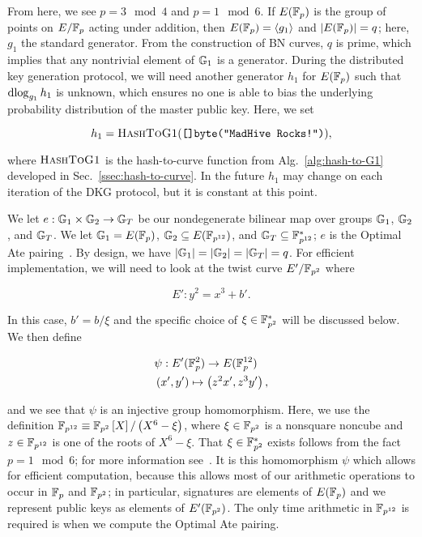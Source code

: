 \noindent
From here, we see $p = 3 \mod 4$ and $p = 1 \mod 6$.
If $E(\mathbb{F}_{p})$ is the group of points on $E/\mathbb{F}_{p}$
acting under addition, then $E(\mathbb{F}_{p}) = \left\langle g_{1} \right\rangle$
and $\left| E(\mathbb{F}_{p}) \right| = q$; here, $g_{1}$ the standard generator.
From the construction of BN curves, $q$ is prime,
which implies that any nontrivial element of $\mathbb{G}_{1}$ is a generator.
During the distributed key generation protocol, we will
need another generator $h_{1}$ for $E(\mathbb{F}_{p})$ such that
$\operatorname{dlog}_{g_{1}}h_{1}$ is unknown, which ensures no one
is able to bias the underlying probability distribution
of the master public key.
Here, we set

\begin{equation}
    h_{1} = \textsc{HashToG1}(\texttt{[]byte("MadHive Rocks!")}),
\end{equation}

\noindent
where $\textsc{HashToG1}$ is the hash-to-curve function
from Alg.~\ref{alg:hash-to-G1} developed in
Sec.~\ref{ssec:hash-to-curve}.
In the future $h_{1}$ may change on each iteration of the DKG
protocol, but it is constant at this point.


We let $e:\mathbb{G}_{1}\times\mathbb{G}_{2}\to\mathbb{G}_{T}$ be our nondegenerate
bilinear map over groups $\mathbb{G}_{1}$, $\mathbb{G}_{2}$, and $\mathbb{G}_{T}$.
We let $\mathbb{G}_{1} = E(\mathbb{F}_{p})$, $\mathbb{G}_{2}\subseteq E(\mathbb{F}_{p^{12}})$,
and $\mathbb{G}_{T}\subseteq \mathbb{F}_{p^{12}}^{*}$;
$e$ is the Optimal Ate pairing~\cite{bnCurves}.
By design, we have $\left| \mathbb{G}_{1} \right| = \left| \mathbb{G}_{2} \right| = \left| \mathbb{G}_{T} \right| = q$.
For efficient implementation, we will need to look at the twist
curve $E'/\mathbb{F}_{p^{2}}$ where

\begin{equation}
    E' : y^{2} = x^{3} + b'.
\end{equation}

\noindent
In this case, $b' = b/\xi$ and the specific choice of
$\xi\in\mathbb{F}_{p^{2}}^{*}$ will be discussed below.
We then define

\begin{align}
    &\psi:E'(\mathbb{F}_{p}^{2})\to E(\mathbb{F}_{p}^{12}) \nonumber\\
    &\left( x',y' \right) \mapsto \left( z^{2}x',z^{3}y' \right),
\end{align}

\noindent
and we see that $\psi$ is an injective group homomorphism.
Here, we use the definition
$\mathbb{F}_{p^{12}} \equiv \mathbb{F}_{p^{2}}\left[ X \right]/\left( X^{6}-\xi \right)$,
where $\xi\in\mathbb{F}_{p^{2}}$ is a nonsquare noncube
and $z\in\mathbb{F}_{p^{12}}$ is one of the roots of $X^{6}-\xi$.
That $\xi\in\mathbb{F}_{p^{2}}^{*}$ exists follows from
the fact $p = 1\mod 6$; for more information
see~\cite[Lemma 1]{bnCurves}.
It is this homomorphism $\psi$  which allows for efficient
computation, because this allows most of our arithmetic operations
to occur in $\mathbb{F}_{p}$ and $\mathbb{F}_{p^{2}}$;
in particular, signatures are elements of $E(\mathbb{F}_{p})$
and we represent public keys as elements of $E'(\mathbb{F}_{p^{2}})$.
The only time arithmetic in $\mathbb{F}_{p^{12}}$ is required is when
we compute the Optimal Ate pairing.


